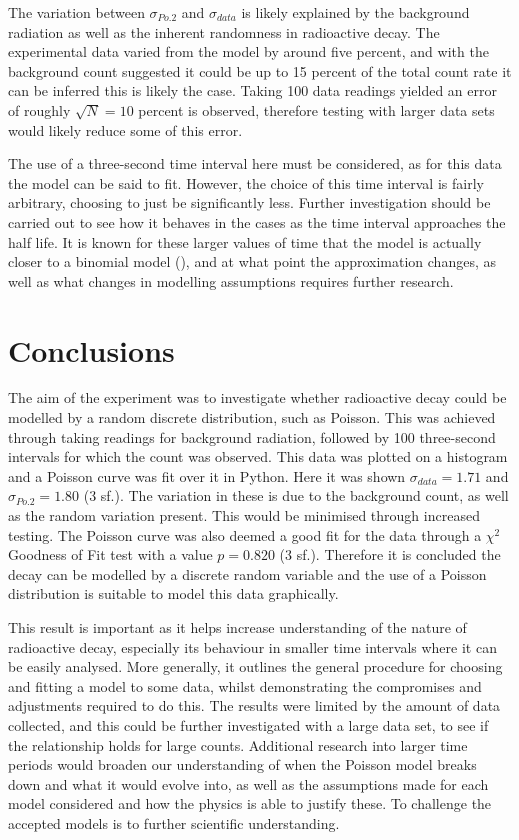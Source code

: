 \documentclass[11pt]{article}
\begin{document}
\noindent The variation between $\sigma_{Po.2}$ and $\sigma_{data}$ is likely explained by the background radiation as well as the inherent randomness in radioactive decay. The experimental data varied from the model by around five percent, and with the background count suggested it could be up to 15 percent of the total count rate it can be inferred this is likely the case. Taking 100 data readings yielded an error of roughly $\sqrt{N} = 10$ percent is observed, therefore testing with larger data sets would likely reduce some of this error.  

\noindent The use of a three-second time interval here must be considered, as for this data the model can be said to fit. However, the choice of this time interval is fairly arbitrary, choosing to just be significantly less. Further investigation should be carried out to see how it behaves in the cases as the time interval approaches the half life. It is known for these larger values of time that the model is actually closer to a binomial model (\cite{SITEK20151105}), and at what point the approximation changes, as well as what changes in modelling assumptions requires further research.
    \section{Conclusions}
The aim of the experiment was to investigate whether radioactive decay could be modelled by a random discrete distribution, such as Poisson. This was achieved through taking readings for background radiation, followed by 100 three-second intervals for which the count was observed. This data was plotted on a histogram and a Poisson curve was fit over it in Python. Here it was shown $\sigma_{data} = 1.71$ and $\sigma_{Po.2} = 1.80$ (3 sf.). The variation in these is due to the background count, as well as the random variation present. This would be minimised through increased testing. The Poisson curve was also deemed a good fit for the data through a $\chi^{2}$ Goodness of Fit test with a value $p = 0.820$ (3 sf.). Therefore it is  concluded the decay can be modelled by a discrete random variable and the use of a Poisson distribution is suitable to model this data graphically.

\noindent This result is important as it helps increase understanding of the nature of radioactive decay, especially its behaviour in smaller time intervals where it can be easily analysed. More generally, it outlines the general procedure for choosing and fitting a model to some data, whilst demonstrating the compromises and adjustments required to do this. The results were limited by the amount of data collected, and this could be further investigated with a large data set, to see if the relationship holds for large counts. Additional research into larger time periods would broaden our understanding of when the Poisson model breaks down and what it would evolve into, as well as the assumptions made for each model considered and how the physics is able to justify these. To challenge the accepted models is to further scientific understanding.
\end{document}
